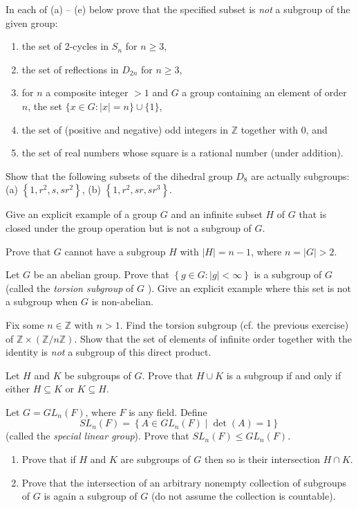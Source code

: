 \begin{questions}
\question
In each of (a) -- (e) below prove that the specified subset is \textit{not} a subgroup of the given group:
\begin{enumerate}[label=(\alph*)]
    \item the set of 2-cycles in \(S_n\) for \(n \geq 3\),
    \item the set of reflections in \(D_{2 n}\) for \(n \geq 3\),
    \item for \(n\) a composite integer \(>1\) and \(G\) a group containing an element of order \(n\), the set \(\{x \in G : | x |=n\} \cup\{1\}\),
    \item the set of (positive and negative) odd integers in \(\mathbb{Z}\) together with 0, and
    \item the set of real numbers whose square is a rational number (under addition).
\end{enumerate}

\question
Show that the following subsets of the dihedral group \(D_8\) are actually subgroups:
(a) \(\left\{1, r^2, s, s r^2\right\}\),
(b) \(\left\{1, r^2, s r, s r^3\right\}\).

\question
Give an explicit example of a group \(G\) and an infinite subset \(H\) of \(G\) that is closed under the group operation but is not a subgroup of \(G\).

\question
Prove that \(G\) cannot have a subgroup \(H\) with \(|H|=n-1\), where \(n=|G|>2\).


\question
Let \(G\) be an abelian group. Prove that \(\left\{g \in G :  |g| <\infty\right\}\) is a subgroup of \(G\) (called the \textit{torsion subgroup} of \(G\) ). Give an explicit example where this set is not a subgroup when \(G\) is non-abelian.


\question
Fix some \(n \in \mathbb{Z}\) with \(n>1\). Find the torsion subgroup (cf. the previous exercise) of \(\mathbb{Z} \times(\mathbb{Z} / n \mathbb{Z})\). Show that the set of elements of infinite order together with the identity is \textit{not} a subgroup of this direct product.


\question
Let \(H\) and \(K\) be subgroups of \(G\). Prove that \(H \cup K\) is a subgroup if and only if either \(H \subseteq K\) or \(K \subseteq H\).


\question
Let \(G=G L_n(F)\), where \(F\) is any field. Define
\[
S L_n(F)=\left\{A \in G L_n(F) \mid \operatorname{det}(A)=1\right\}
\]
(called the \textit{special linear group}). Prove that \(S L_n(F) \leq G L_n(F)\).


\question
\begin{enumerate}[label=(\alph*)]
    \item Prove that if \({H}\) and \({K}\) are subgroups of \(G\) then so is their intersection \(H \cap {K}\).
    \item Prove that the intersection of an arbitrary nonempty collection of subgroups of \(G\) is again a subgroup of \(G\) (do not assume the collection is countable).
\end{enumerate}




\end{questions}
